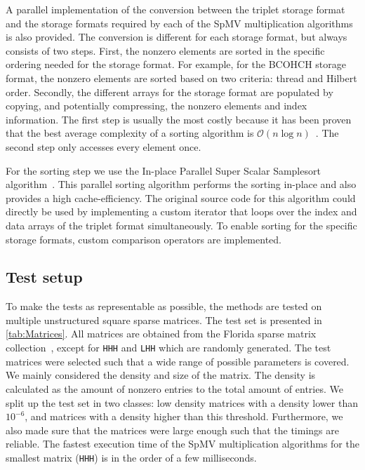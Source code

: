 \documentclass{siamart220329}
\begin{document}
A parallel implementation of the conversion between the triplet storage format and the storage formats required by each of the SpMV multiplication algorithms is also provided. The conversion is different for each storage format, but always consists of two steps. First, the nonzero elements are sorted in the specific ordering needed for the storage format. For example, for the BCOHCH storage format, the nonzero elements are sorted based on two criteria: thread and Hilbert order. Secondly, the different arrays for the storage format are populated by copying, and potentially compressing, the nonzero elements and index information. The first step is usually the most costly because it has been proven that the best average complexity of a sorting algorithm is $\mathcal{O}(n \log{n})$~\cite{IntroToAlgorithms}. The second step only accesses every element once.

For the sorting step we use the In-place Parallel Super Scalar Samplesort algorithm~\cite{IPS4o}. This parallel sorting algorithm performs the sorting in-place and also provides a high cache-efficiency. The original source code for this algorithm could directly be used by implementing a custom iterator that loops over the index and data arrays of the triplet format simultaneously. To enable sorting for the specific storage formats, custom comparison operators are implemented.

\subsection{Test setup}\label{sec:testSetup}
To make the tests as representable as possible, the methods are tested on multiple unstructured square sparse matrices. The test set is presented in \cref{tab:Matrices}. All matrices are obtained from the Florida sparse matrix collection~\cite{SparseTamuEdu}, except for \texttt{HHH} and \texttt{LHH} which are randomly generated. The test matrices were selected such that a wide range of possible parameters is covered. We mainly considered the density and size of the matrix. The density is calculated as the amount of nonzero entries to the total amount of entries. We split up the test set in two classes: low density matrices with a density lower than $10^{-6}$, and matrices with a density higher than this threshold. Furthermore, we also made sure that the matrices were large enough such that the timings are reliable. The fastest execution time of the SpMV multiplication algorithms for the smallest matrix (\texttt{HHH}) is in the order of a few milliseconds.
\end{document}
